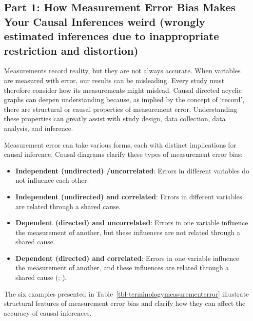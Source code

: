 \documentclass[
  single column]{article}
\providecommand{\tightlist}{%
  \setlength{\itemsep}{0pt}\setlength{\parskip}{0pt}}\usepackage{longtable,booktabs,array}
\begin{document}
\subsection{\texorpdfstring{Part 1: How Measurement Error Bias Makes
Your Causal Inferences \textbf{weird} (\textbf{w}rongly
\textbf{e}stimated inferences due to \textbf{i}nappropriate
\textbf{r}estriction and
\textbf{d}istortion)}{Part 1: How Measurement Error Bias Makes Your Causal Inferences weird (wrongly estimated inferences due to inappropriate restriction and distortion)}}\label{id-sec-1}

Measurements record reality, but they are not always accurate. When
variables are measured with error, our results can be misleading. Every
study must therefore consider how its measurements might mislead. Causal
directed acyclic graphs can deepen understanding because, as implied by
the concept of `record', there are structural or causal properties of
measurement error. Understanding these properties can greatly assist
with study design, data collection, data analysis, and inference.

Measurement error can take various forms, each with distinct
implications for causal inference. Causal diagrams clarify these types
of measurement error bias:

\begin{itemize}
\tightlist
\item
  \textbf{Independent (undirected) /uncorrelated}: Errors in different
  variables do not influence each other.
\item
  \textbf{Independent (undirected) and correlated}: Errors in different
  variables are related through a shared cause.
\item
  \textbf{Dependent (directed) and uncorrelated}: Errors in one variable
  influence the measurement of another, but these influences are not
  related through a shared cause.
\item
  \textbf{Dependent (directed) and correlated}: Errors in one variable
  influence the measurement of another, and these influences are related
  through a shared cause (; ).
\end{itemize}

The six examples presented in
Table~\ref{tbl-terminologymeasurementerror} illustrate structural
features of measurement error bias and clarify how they can affect the
accuracy of causal inferences.
\end{document}
